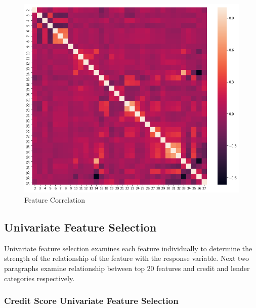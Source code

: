 \begin{Schunk}
\begin{figure}[H]

{\centering \includegraphics[width=0.75\linewidth]{../../artifacts/cmatrix} 

}

\caption[Feature Correlation]{Feature Correlation}\label{fig:cmatrix}
\end{figure}
\end{Schunk}

\hypertarget{univariate-feature-selection}{%
\subsection{Univariate Feature
Selection}\label{univariate-feature-selection}}

Univariate feature selection examines each feature individually to
determine the strength of the relationship of the feature with the
response variable. Next two paragraphs examine relationship between top
20 features and credit and lender categories respectively.

\hypertarget{credit-score-univariate-feature-selection}{%
\subsubsection{Credit Score Univariate Feature
Selection}\label{credit-score-univariate-feature-selection}}

